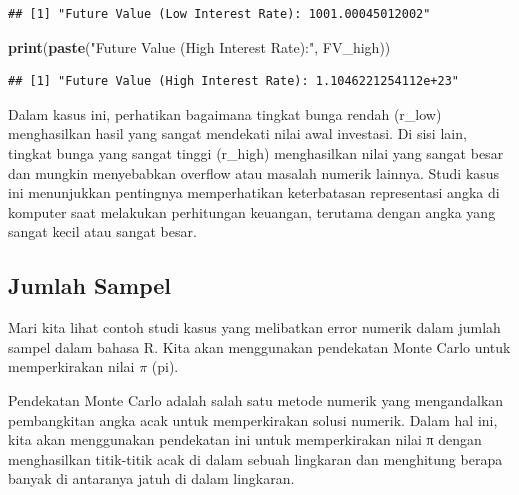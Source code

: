 \documentclass[
]{book}
\newenvironment{Shaded}{\begin{snugshade}}{\end{snugshade}}
\newcommand{\FunctionTok}[1]{\textcolor[rgb]{0.13,0.29,0.53}{\textbf{#1}}}
\newcommand{\NormalTok}[1]{#1}
\newcommand{\StringTok}[1]{\textcolor[rgb]{0.31,0.60,0.02}{#1}}
\theoremstyle{definition}
\theoremstyle{definition}
\theoremstyle{definition}
\theoremstyle{definition}
\theoremstyle{remark}
\begin{document}
\begin{verbatim}
## [1] "Future Value (Low Interest Rate): 1001.00045012002"
\end{verbatim}

\begin{Shaded}
\begin{Highlighting}[]
\FunctionTok{print}\NormalTok{(}\FunctionTok{paste}\NormalTok{(}\StringTok{"Future Value (High Interest Rate):"}\NormalTok{, FV\_high))}
\end{Highlighting}
\end{Shaded}

\begin{verbatim}
## [1] "Future Value (High Interest Rate): 1.1046221254112e+23"
\end{verbatim}

Dalam kasus ini, perhatikan bagaimana tingkat bunga rendah (r\_low) menghasilkan hasil yang sangat mendekati nilai awal investasi. Di sisi lain, tingkat bunga yang sangat tinggi (r\_high) menghasilkan nilai yang sangat besar dan mungkin menyebabkan overflow atau masalah numerik lainnya. Studi kasus ini menunjukkan pentingnya memperhatikan keterbatasan representasi angka di komputer saat melakukan perhitungan keuangan, terutama dengan angka yang sangat kecil atau sangat besar.

\hypertarget{jumlah-sampel}{%
\subsection{Jumlah Sampel}\label{jumlah-sampel}}

Mari kita lihat contoh studi kasus yang melibatkan error numerik dalam jumlah sampel dalam bahasa R. Kita akan menggunakan pendekatan Monte Carlo untuk memperkirakan nilai \(π\) (pi).

Pendekatan Monte Carlo adalah salah satu metode numerik yang mengandalkan pembangkitan angka acak untuk memperkirakan solusi numerik. Dalam hal ini, kita akan menggunakan pendekatan ini untuk memperkirakan nilai π dengan menghasilkan titik-titik acak di dalam sebuah lingkaran dan menghitung berapa banyak di antaranya jatuh di dalam lingkaran.
\end{document}
